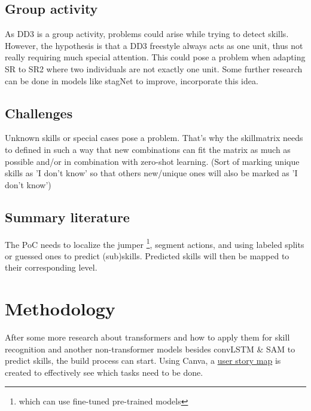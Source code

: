 \subsection{Group activity}

As DD3 is a group activity, problems could arise while trying to detect skills. However, the hypothesis is that a DD3 freestyle always acts as one unit, thus not really requiring much special attention. This could pose a problem when adapting SR to SR2 where two individuals are not exactly one unit. Some further research can be done in models like stagNet \autocite{Qi_2020} to improve, incorporate this idea.

\subsection{Challenges}
\label{subsec:challenges}

Unknown skills or special cases pose a problem. That's why the skillmatrix needs to defined in such a way that new combinations can fit the matrix as much as possible and/or in combination with zero-shot learning. (Sort of marking unique skills as 'I don't know' so that others new/unique ones will also be marked as 'I don't know')


\subsection{Summary literature}
\label{subsec:summary literature}

The PoC needs to localize the jumper \footnote{which can use fine-tuned pre-trained models}, segment actions, and using labeled splits or guessed ones to predict (sub)skills.
Predicted skills will then be mapped to their corresponding level.

\section{Methodology}%
\label{sec:methodoly}

After some more research about transformers and how to apply them for skill recognition and another non-transformer models besides convLSTM \& SAM to predict skills, the build process can start.
Using Canva, a \href{https://www.canva.com/design/DAGVz44QCgc/\_Mr9BrOqwwdy9cf-ieYFVg/edit?utm\_content=DAGVz44QCgc\&utm\_campaign=designshare\&utm\_medium=link2\&utm\_source=sharebutton}{user story map} is created to effectively see which tasks need to be done.

